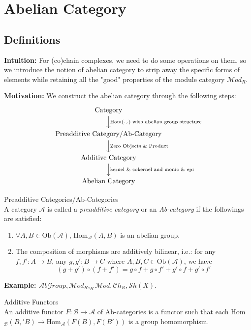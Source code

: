 \section{Abelian Category}

\subsection{Definitions}

\noindent\textbf{Intuition:} For (co)chain complexes, we need to do some operations on them, so we introduce the notion of abelian category to strip away the specific forms of elements while retaining all the "good" properties of the module category $\mathcal{M}od_R$.

\noindent\textbf{Motivation:} We construct the abelian category through the following steps:
\[
\begin{tikzcd}
    \text{Category} \arrow[d, "\text{Hom(} \cdot {,} \cdot \text{) with abelian group structure}"]\\
    \text{Preadditive Category/Ab-Category} \arrow[d, "\text{Zero Objects } \& \text{ Product}"]\\
    \text{Additive Category} \arrow[d, "\text{kernel } \& \text{ cokernel and monic }\& \text{ epi}"]\\
    \text{Abelian Category}
\end{tikzcd}
\]

\begin{definition}{Preadditive Categories/Ab-Categories}\\
A category $\mathcal{A}$ is called a \textit{preadditive category} or an \textit{Ab-category} if the followings are satisfied:
\begin{enumerate}
    \item $\forall A,B\in \text{Ob}(\mathcal{A})$, Hom$_\mathcal{A} (A,B)$ is an abelian group.
    \item The composition of morphisms are additively bilinear, i.e.: for any $ f,f': A\to B$, any $g,g':B\to C$ where $A,B,C\in \text{Ob}(\mathcal{A})$, we have
    \[
    (g+g') \circ (f+f')= g\circ f+ g\circ f' +g'\circ f+g'\circ f'
    \]
\end{enumerate}
\end{definition}


\noindent\textbf{Example:} $\mathcal{A}b \mathcal{G}roup, \mathcal{M}od_R ,_R \mathcal{M}od , \mathcal{C}h_R, \mathcal{S}h(X)$.

\begin{definition}{Additive Functors}\\
An additive functor $F: \mathcal{B} \to \mathcal  A$ of Ab-categories is a functor such that each Hom$_\mathcal{B} (B,'B) \to \text{Hom}_\mathcal{A} (F(B),F(B'))$ is a group homomorphism.
\end{definition}

